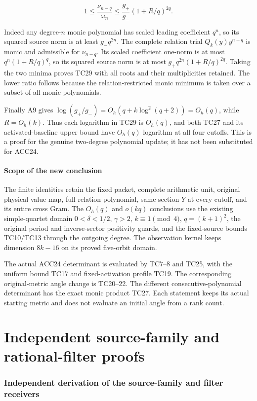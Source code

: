 \documentclass[11pt]{article}
\begin{document}
\[
1\le\frac{\nu_{n-q}}{\omega_n}
\le\frac{g_+}{g_-}(1+R/q)^{2q}.
\tag{TC29}
\]

Indeed any degree-\(n\) monic polynomial has scaled leading coefficient \(q^n\), so its squared source norm is at least \(g_-q^{2n}\). The complete relation trial \(Q_k(y)y^{n-q}\) is monic and admissible for \(\nu_{n-q}\). Its scaled coefficient one-norm is at most \(q^n(1+R/q)^q\), so its squared source norm is at most \(g_+q^{2n}(1+R/q)^{2q}\). Taking the two minima proves TC29 with all roots and their multiplicities retained. The lower ratio follows because the relation-restricted monic minimum is taken over a subset of all monic polynomials.

Finally A9 gives \(\log(g_+/g_-)=O_h(q+k\log^2(q+2))=O_h(q)\), while \(R=O_h(k)\). Thus each logarithm in TC29 is \(O_h(q)\), and both TC27 and its activated-baseline upper bound have \(O_h(q)\) logarithm at all four cutoffs. This is a proof for the genuine two-degree polynomial update; it has not been substituted for ACC24.

\subsection{Scope of the new conclusion}\label{scope-of-the-new-conclusion}

The finite identities retain the fixed packet, complete arithmetic unit, original physical value map, full relation polynomial, same section \(Y\) at every cutoff, and its entire cross Gram. The \(O_h(q)\) and \(o(kq)\) conclusions use the existing simple-quartet domain \(0<\delta<1/2\), \(\gamma>2\), \(k\equiv1\pmod4\), \(q=(k+1)^2\), the original period and inverse-sector positivity guards, and the fixed-source bounds TC10/TC13 through the outgoing degree. The observation kernel keeps dimension \(8k-16\) on its proved five-orbit domain.

The actual ACC24 determinant is evaluated by TC7--8 and TC25, with the uniform bound TC17 and fixed-activation profile TC19. The corresponding original-metric angle change is TC20--22. The different consecutive-polynomial determinant has the exact monic product TC27. Each statement keeps its actual starting metric and does not evaluate an initial angle from a rank count.

\clearpage\part{Independent source-family and rational-filter proofs}
\section{Independent derivation of the source-family and filter receivers}\label{independent-derivation-of-the-source-family-and-filter-receivers}
\end{document}
